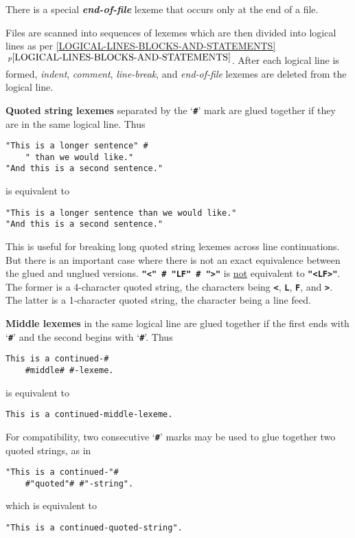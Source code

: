 \documentclass[12pt]{article}
\newcommand{\TT}[1]{{\tt \bfseries #1}}
\newcommand{\key}[1]{{\rm \bfseries #1}}
\newcommand{\emkey}[1]{{\em \bfseries #1}}
\newcommand{\itemref}[1]{\ref{#1}$\,^{p\pageref{#1}}$}
\newenvironment{indpar}[1][0.3in]%
	{\begin{list}{}%
		     {\setlength{\itemsep}{0in}%
		      \setlength{\topsep}{0in}%
		      \setlength{\parsep}{1ex}%
		      \setlength{\labelwidth}{#1}%
		      \setlength{\leftmargin}{#1}%
		      \addtolength{\leftmargin}{\labelsep}}%
	 \item}%
	{\end{list}}
\begin{document}
There is a special \emkey{end-of-file}\label{END-OF-FILE}
lexeme that occurs only at the end of a file.

Files are scanned into sequences of lexemes which are then divided
into logical lines as per \itemref{LOGICAL-LINES-BLOCKS-AND-STATEMENTS}.
After each logical line is formed,
{\em indent}, {\em comment},
{\em line-break}, and {\em end-of-file} lexemes are deleted
from the logical line.

\key{Quoted string lexemes}
\label{QUOTED-STRING-CONCATENATION}
separated by the `\TT{\#}' mark
are glued together if they are in the
same logical line.  Thus
\begin{indpar}\begin{verbatim}
"This is a longer sentence" #
    " than we would like."
"And this is a second sentence."
\end{verbatim}\end{indpar}
is equivalent to
\begin{indpar}\begin{verbatim}
"This is a longer sentence than we would like."
"And this is a second sentence."
\end{verbatim}\end{indpar}
This is useful for
breaking long quoted string lexemes across line continuations.
But there is an important case where there is not an exact equivalence
between the glued and unglued versions.  \TT{"<" \# "LF" \# ">"} is
\underline{not} equivalent to \TT{"<LF>"}.  The former is a 4-character
quoted string, the characters being \TT{<}, \TT{L}, \TT{F},
and \TT{>}.  The latter is a 1-character quoted string, the character
being a line feed.

\key{Middle lexemes}
in the same logical line are glued together if the first
ends with `\TT{\#}' and the second begins with `\TT{\#}'.
Thus
\begin{indpar}\begin{verbatim}
This is a continued-#
    #middle# #-lexeme.
\end{verbatim}\end{indpar}
is equivalent to
\begin{indpar}\begin{verbatim}
This is a continued-middle-lexeme.
\end{verbatim}\end{indpar}
For compatibility, two consecutive `\TT{\#}' marks may be used
to glue together two quoted strings, as in
\begin{indpar}\begin{verbatim}
"This is a continued-"#
    #"quoted"# #"-string".
\end{verbatim}\end{indpar}
which is equivalent to
\begin{indpar}\begin{verbatim}
"This is a continued-quoted-string".
\end{verbatim}\end{indpar}
\end{document}
